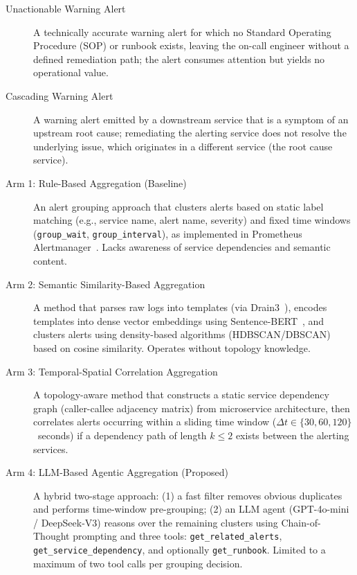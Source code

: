 \begin{description}
\item[Unactionable Warning Alert]
A technically accurate warning alert for which no Standard Operating Procedure (SOP) or runbook exists, leaving the on-call engineer without a defined remediation path; the alert consumes attention but yields no operational value.

\item[Cascading Warning Alert]
A warning alert emitted by a downstream service that is a symptom of an upstream root cause; remediating the alerting service does not resolve the underlying issue, which originates in a different service (the root cause service).


\item[Arm 1: Rule-Based Aggregation (Baseline)]
An alert grouping approach that clusters alerts based on static label matching (e.g., service name, alert name, severity) and fixed time windows (\texttt{group\_wait}, \texttt{group\_interval}), as implemented in Prometheus Alertmanager~\cite{prometheus-alertmanager}. Lacks awareness of service dependencies and semantic content.

\item[Arm 2: Semantic Similarity-Based Aggregation]
A method that parses raw logs into templates (via Drain3~\cite{drain3}), encodes templates into dense vector embeddings using Sentence-BERT~\cite{sbert}, and clusters alerts using density-based algorithms (HDBSCAN/DBSCAN) based on cosine similarity. Operates without topology knowledge.

\item[Arm 3: Temporal-Spatial Correlation Aggregation]
A topology-aware method that constructs a static service dependency graph (caller-callee adjacency matrix) from microservice architecture, then correlates alerts occurring within a sliding time window ($\Delta t \in \{30, 60, 120\}$~seconds) if a dependency path of length $k \le 2$ exists between the alerting services.

\item[Arm 4: LLM-Based Agentic Aggregation (Proposed)]
A hybrid two-stage approach: (1) a fast filter removes obvious duplicates and performs time-window pre-grouping; (2) an LLM agent (GPT-4o-mini / DeepSeek-V3) reasons over the remaining clusters using Chain-of-Thought prompting and three tools: \texttt{get\_related\_alerts}, \texttt{get\_service\_dependency}, and optionally \texttt{get\_runbook}. Limited to a maximum of two tool calls per grouping decision.


\end{description}
